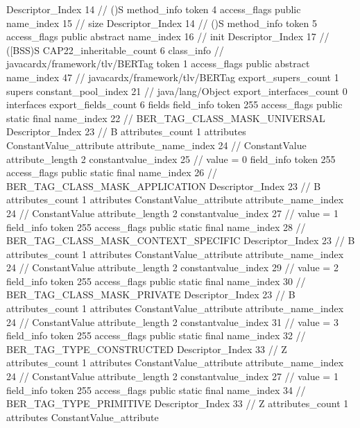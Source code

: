 {{{{{					Descriptor_Index	14		// ()S
				}
				method_info {
					token	4
					access_flags	public
					name_index	15		// size
					Descriptor_Index	14		// ()S
				}
				method_info {
					token	5
					access_flags	public abstract
					name_index	16		// init
					Descriptor_Index	17		// ([BSS)S
				}
			}
			CAP22_inheritable_count	6
		}
		class_info {		// javacardx/framework/tlv/BERTag
			token	1
			access_flags	public abstract
			name_index	47		// javacardx/framework/tlv/BERTag
			export_supers_count	1
			supers {
				constant_pool_index	21		// java/lang/Object
			}
			export_interfaces_count	0
			interfaces {
			}
			export_fields_count	6
			fields {
			field_info {
				token	255
				access_flags	public static final
				name_index	22		// BER_TAG_CLASS_MASK_UNIVERSAL
				Descriptor_Index	23		// B
				attributes_count	1
				attributes {
				ConstantValue_attribute {
					attribute_name_index	24		// ConstantValue
					attribute_length	2
					constantvalue_index	25		// value = 0
				}
				}
			}
			field_info {
				token	255
				access_flags	public static final
				name_index	26		// BER_TAG_CLASS_MASK_APPLICATION
				Descriptor_Index	23		// B
				attributes_count	1
				attributes {
				ConstantValue_attribute {
					attribute_name_index	24		// ConstantValue
					attribute_length	2
					constantvalue_index	27		// value = 1
				}
				}
			}
			field_info {
				token	255
				access_flags	public static final
				name_index	28		// BER_TAG_CLASS_MASK_CONTEXT_SPECIFIC
				Descriptor_Index	23		// B
				attributes_count	1
				attributes {
				ConstantValue_attribute {
					attribute_name_index	24		// ConstantValue
					attribute_length	2
					constantvalue_index	29		// value = 2
				}
				}
			}
			field_info {
				token	255
				access_flags	public static final
				name_index	30		// BER_TAG_CLASS_MASK_PRIVATE
				Descriptor_Index	23		// B
				attributes_count	1
				attributes {
				ConstantValue_attribute {
					attribute_name_index	24		// ConstantValue
					attribute_length	2
					constantvalue_index	31		// value = 3
				}
				}
			}
			field_info {
				token	255
				access_flags	public static final
				name_index	32		// BER_TAG_TYPE_CONSTRUCTED
				Descriptor_Index	33		// Z
				attributes_count	1
				attributes {
				ConstantValue_attribute {
					attribute_name_index	24		// ConstantValue
					attribute_length	2
					constantvalue_index	27		// value = 1
				}
				}
			}
			field_info {
				token	255
				access_flags	public static final
				name_index	34		// BER_TAG_TYPE_PRIMITIVE
				Descriptor_Index	33		// Z
				attributes_count	1
				attributes {
				ConstantValue_attribute {
}}}}}}}
